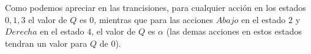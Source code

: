 Como podemos apreciar en las trancisiones, para cualquier acción en los estados $0,1,3$ el valor de $Q$ es $0$, mientras que para las acciones $Abajo$ en el estado $2$ y $Derecha$ en el estado $4$, el valor de $Q$ es $\alpha$ (las demas acciones en estos estados tendran un valor para $Q$ de $0$).

